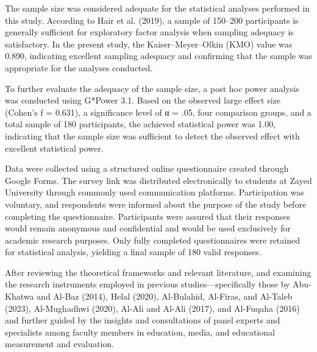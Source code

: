 \documentclass[10pt]{NSP1}
\begin{document}
\par\medskip{}\smallskip

The sample size was considered adequate for the statistical analyses performed in this study. According to Hair et al. (2019), a sample of 150–200 participants is generally sufficient for exploratory factor analysis when sampling adequacy is satisfactory. In the present study, the Kaiser–Meyer–Olkin (KMO) value was 0.890, indicating excellent sampling adequacy and confirming that the sample was appropriate for the analyses conducted.

To further evaluate the adequacy of the sample size, a post hoc power analysis was conducted using G*Power 3.1. Based on the observed large effect size (Cohen's f = 0.631), a significance level of α = .05, four comparison groups, and a total sample of 180 participants, the achieved statistical power was 1.00, indicating that the sample size was sufficient to detect the observed effect with excellent statistical power.

\par\medskip{}\smallskip

Data were collected using a structured online questionnaire created through Google Forms. The survey link was distributed electronically to students at Zayed University through commonly used communication platforms. Participation was voluntary, and respondents were informed about the purpose of the study before completing the questionnaire. Participants were assured that their responses would remain anonymous and confidential and would be used exclusively for academic research purposes. Only fully completed questionnaires were retained for statistical analysis, yielding a final sample of 180 valid responses.

\par\medskip{}\smallskip

After reviewing the theoretical frameworks and relevant literature, and examining the research instruments employed in previous studies—specifically those by Abu-Khatwa and Al-Baz (2014), Helal (2020), Al-Bulahid, Al-Firas, and Al-Taleb (2023), Al-Mughadhwi (2020), Al-Ali and Al-Ali (2017), and Al-Fuqaha (2016) and further guided by the insights and consultations of panel experts and specialists among faculty members in education, media, and educational measurement and evaluation.
\end{document}
